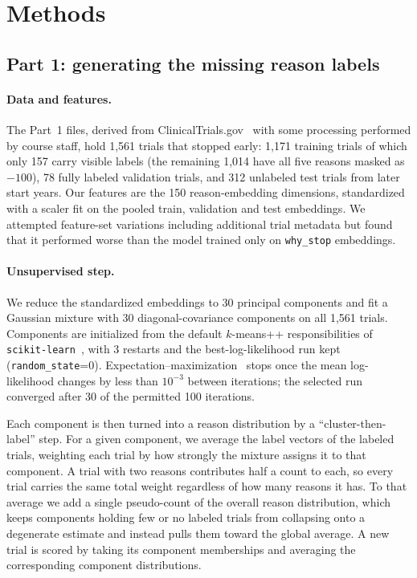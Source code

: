 \section{Methods}
\label{sec:methods}

\subsection{Part 1: generating the missing reason labels}

\paragraph{Data and features.}
 The Part~1 files, derived from
ClinicalTrials.gov~\cite{clinicaltrials} with some processing performed by course staff, hold 1,561 trials that stopped early: 1,171 training trials of
which only 157 carry visible labels (the remaining 1,014 have all five reasons
masked as $-100$), 78 fully labeled validation trials, and 312 unlabeled test
trials from later start years. Our features are the 150 reason-embedding
dimensions, standardized with a scaler fit on the pooled train, validation and
test embeddings. We attempted feature-set variations including additional trial metadata but found that it performed worse than the model trained only on \texttt{why\_stop} embeddings.

\paragraph{Unsupervised step.}
We reduce the standardized embeddings to 30 principal components and fit a
Gaussian mixture with 30 diagonal-covariance components on all 1,561 trials.
Components are initialized from the default $k$-means++ responsibilities of
\texttt{scikit-learn}~\cite{pedregosa2011scikit}, with 3 restarts and the
best-log-likelihood run kept (\texttt{random\_state}=0).
Expectation--maximization~\cite{dempster1977em} stops once the mean
log-likelihood changes by less than $10^{-3}$ between iterations; the selected run
converged after 30 of the permitted 100 iterations.

Each component is then turned into a reason distribution by a
``cluster-then-label'' step. For a given component, we average the label vectors
of the labeled trials, weighting each trial by how strongly the mixture assigns it
to that component. A trial with two reasons contributes half a count to each, so
every trial carries the same total weight regardless of how many reasons it has.
To that average we add a single pseudo-count of the overall reason distribution,
which keeps components holding few or no labeled trials from collapsing onto a
degenerate estimate and instead pulls them toward the global average. A new trial
is scored by taking its component memberships and averaging the corresponding
component distributions.

